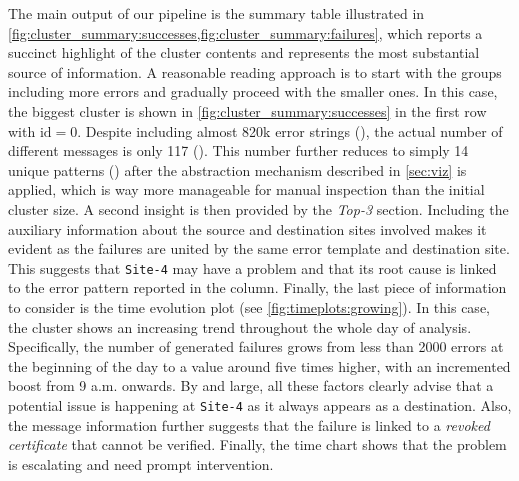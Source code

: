 The main output of our pipeline is the summary table illustrated in \cref{fig:cluster_summary:successes,fig:cluster_summary:failures}, which reports a succinct highlight of the cluster contents and represents the most substantial source of information.
A reasonable reading approach is to start with the groups including more errors and gradually proceed with the smaller ones.
In this case, the biggest cluster is shown in \cref{fig:cluster_summary:successes} in the first row with $\text{id}=0$.
Despite including almost 820k error strings (), the actual number of different messages is only 117%
 ().
This number further reduces to simply 14 unique patterns () after the abstraction mechanism described in \cref{sec:viz} is applied, which is way more manageable for manual inspection than the initial cluster size.
A second insight is then provided by the \textit{Top-3} section. 
Including the auxiliary information about the source and destination sites involved makes it evident as the failures are united by the same error template and destination site.
This suggests that \texttt{Site-4} may have a problem and that its root cause is linked to the error pattern reported in the  column. 
Finally, the last piece of information to consider is the time evolution plot (see \cref{fig:timeplots:growing}). 
In this case, the cluster shows an increasing trend throughout the whole day of analysis. Specifically, the number of generated failures grows from less than 2000 errors at the beginning of the day to a value around five times higher, with an incremented boost from 9 a.m. onwards.
By and large, all these factors clearly advise that a potential issue is happening at \texttt{Site-4} as it always appears as a destination. 
Also, the message information further suggests that the failure is linked to a \textit{revoked certificate} that cannot be verified.
Finally, the time chart shows that the problem is escalating and need prompt intervention.

